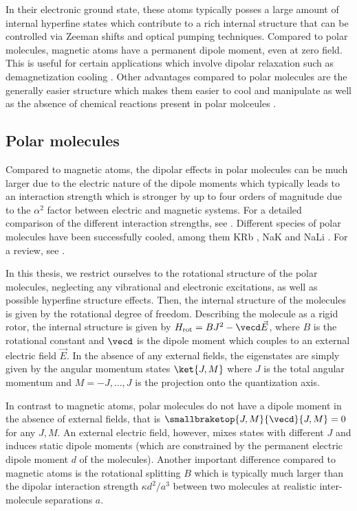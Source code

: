 In their electronic ground state, these atoms typically posses a large amount of internal hyperfine
states which contribute to a rich internal structure that can be controlled via Zeeman shifts
and optical pumping techniques. Compared to polar molecules, magnetic atoms have a permanent
dipole moment, even at zero field. This is useful for certain applications which involve dipolar
relaxation such as demagnetization cooling \cite{Hensler2003,Fattori2006,Volchkov2013}. Other
advantages compared to polar molecules are the generally easier structure which makes them easier
to cool and manipulate as well as the absence of chemical reactions present in polar molceules
\cite{Ospelkaus2010a,Quemener2012}.

\subsection{Polar molecules}

Compared to magnetic atoms, the dipolar effects in polar molecules can be much larger due to the
electric nature of the dipole moments which typically leads to an interaction strength which
is stronger by up to four orders of magnitude due to the $\alpha^2$ factor between electric
and magnetic systems. For a detailed comparison of the different interaction strengths, see
\cite{Lahaye2009}. Different species of polar molecules have been successfully cooled, among them
KRb \cite{Ni2008b,Ospelkaus2010}, NaK \cite{Wu2012a} and NaLi \cite{Heo2012}. For a review, see
\cite{Quemener2012}.

In this thesis, we restrict ourselves to the rotational structure of the polar molecules,
neglecting any vibrational and electronic excitations, as well as possible hyperfine structure
effects. Then, the internal structure of the molecules is given by the rotational degree
of freedom. Describing the molecule as a rigid rotor, the internal structure is given by
$H_\text{rot}=B J^2 - \vecd \vec{E}$, where $B$ is the rotational constant and $\vecd$ is the
dipole moment which couples to an external electric field $\vec{E}$. In the absence of any external
fields, the eigenstates are simply given by the angular momentum states $\ket{J,M}$ where $J$ is
the total angular momentum and $M=-J, \dots, J$ is the projection onto the quantization axis.

In contrast to magnetic atoms, polar molecules do not have a dipole moment in the absence of
external fields, that is $\smallbraketop{J,M}{\vecd}{J,M}=0$ for any $J, M$. An external electric
field, however, mixes states with different $J$ and induces static dipole moments (which are
constrained by the permanent electric dipole moment $d$ of the molecules). Another important
difference compared to magnetic atoms is the rotational splitting $B$ which is typically much
larger than the dipolar interaction strength $\kappa d^2/a^3$ between two molecules at realistic
inter-molecule separations $a$.

